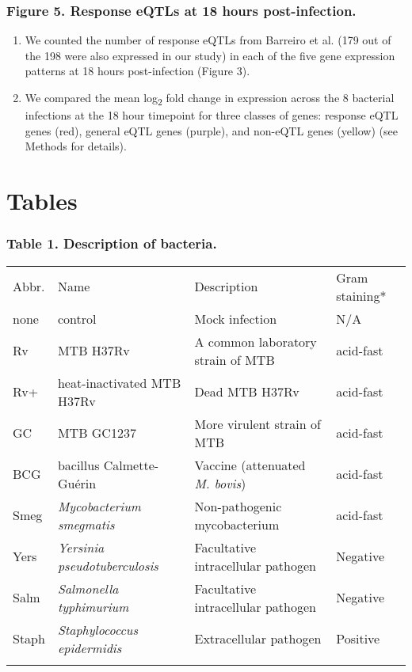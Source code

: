 \subsubsection{Figure 5. Response eQTLs at 18 hours
post-infection.}\label{figure-5.-response-eqtls-at-18-hours-post-infection.}

\begin{enumerate}
\def\labelenumi{(\Alph{enumi})}
\itemsep1pt\parskip0pt
\item
  We counted the number of response eQTLs from Barreiro et al.
  \citep{Barreiro2012} (179 out of the 198 were also expressed in our
  study) in each of the five gene expression patterns at 18 hours
  post-infection (Figure 3).
\item
  We compared the mean log\textsubscript{2} fold change in expression
  across the 8 bacterial infections at the 18 hour timepoint for three
  classes of genes: response eQTL genes (red), general eQTL genes
  (purple), and non-eQTL genes (yellow) (see Methods for details).
\end{enumerate}

\section{Tables}\label{tables}

\subsubsection{Table 1. Description of
bacteria.}\label{table-1.-description-of-bacteria.}

\begin{longtable}[c]{@{}llll@{}}
\toprule\addlinespace
Abbr. & Name & Description & Gram staining*
\\\addlinespace
\midrule\endhead
none & control & Mock infection & N/A
\\\addlinespace
Rv & MTB H37Rv & A common laboratory strain of MTB & acid-fast
\\\addlinespace
Rv+ & heat-inactivated MTB H37Rv & Dead MTB H37Rv & acid-fast
\\\addlinespace
GC & MTB GC1237 & More virulent strain of MTB & acid-fast
\\\addlinespace
BCG & bacillus Calmette-Guérin & Vaccine (attenuated \emph{M. bovis}) &
acid-fast
\\\addlinespace
Smeg & \emph{Mycobacterium smegmatis} & Non-pathogenic mycobacterium &
acid-fast
\\\addlinespace
Yers & \emph{Yersinia pseudotuberculosis} & Facultative intracellular
pathogen & Negative
\\\addlinespace
Salm & \emph{Salmonella typhimurium} & Facultative intracellular
pathogen & Negative
\\\addlinespace
Staph & \emph{Staphylococcus epidermidis} & Extracellular pathogen &
Positive
\\\addlinespace
\bottomrule
\end{longtable}

